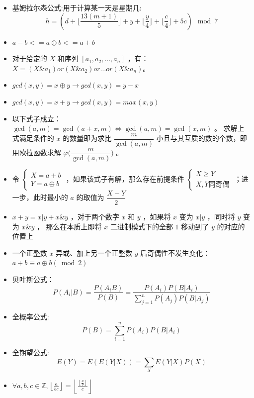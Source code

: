 \begin{itemize}
        将一个点$(x,y)$的坐标变为$(\frac{x + y}{2},\frac{x - y}{2})$ 后,原坐标系中的切比雪夫距离 = 新坐标系中的曼哈顿距离
    \item 基姆拉尔森公式:用于计算某一天是星期几:
        $$h = (d + \lfloor \frac{13(m + 1)}{5} \rfloor + y + \lfloor \frac{y}{4} \rfloor + \lfloor \frac{c}{4} \rfloor + 5c) \mod 7$$ 
    \item $ a - b <= a \oplus b <= a + b  $
    \item 对于给定的 $X$ 和序列 $[a_1,a_2,…,a_n]$ ，有：${X=(X \&a_1)or(X\&a_2)or…or(X\&a_n)}$。
    \item $gcd(x,y) = x \oplus y \to gcd(x,y)=y-x$
    \item $gcd(x,y) = x + y \to gcd(x,y)=max(x,y)$
    \item 以下式子成立： $\gcd (a, m) = \gcd(a+x,m) \Leftrightarrow  \gcd(a, m)=\gcd(x,m)$ 。
    求解上式满足条件的 $x$ 的数量即为求比 $\dfrac{m}{\gcd(a,m)}$ 小且与其互质的数的个数，即用欧拉函数求解 $\varphi \Big(\dfrac{m}{\gcd(a,m)} \Big)$ 。
    \item 令 $\left\{\begin{matrix} X=a+b\\ 
            Y=a\oplus b
            \end{matrix}\right.$ ，如果该式子有解，那么存在前提条件 $\left\{\begin{matrix} X \ge Y \\ 
            X,Y \text{同奇偶}
            \end{matrix}\right.$ ；进一步，此时最小的 $a$ 的取值为 $\dfrac{X-Y}{2}$
    \item $x+y=x|y+x\&y$ ，对于两个数字 $x$ 和 $y$ ，如果将 $x$ 变为 $x|y$ ，同时将 $y$ 变为 $x\&y$ ，
            那么在本质上即将 $x$ 二进制模式下的全部 $1$ 移动到了 $y$ 的对应的位置上
    \item 一个正整数 $x$ 异或、加上另一个正整数 $y$ 后奇偶性不发生变化：$a+b\equiv a\oplus b(\bmod2)$
    \item 贝叶斯公式：$$P(A_i|B) = \frac{P(A_iB)}{P(B)}=\frac{P(A_i)P(B|A_i)}{\displaystyle\sum^{n}_{j=1}P(A_j)P(B|A_j)}$$
    \item 全概率公式: $$P(B) = \sum\limits_{i=1}^{n}P(A_i)P(B | A_i)$$
    \item 全期望公式: $$E(Y) = E(E(Y|X))=\sum \limits_{X}E(Y|X)P(X)$$
    \item $\forall a,b,c \in  \mathbb{Z},\left \lfloor \frac{a}{bc}  \right \rfloor 
        = \left \lfloor \frac{\left \lfloor \frac{a}{b}  \right \rfloor }{c}  \right \rfloor $
\end{itemize}